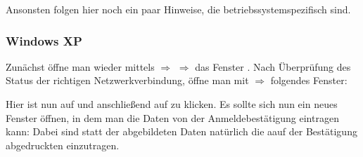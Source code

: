 Ansonsten folgen hier noch ein paar Hinweise, die betriebssystemspezifisch
sind.
\subsubsection{Windows XP}
Zunächst öffne man wieder mittels  $\Rightarrow$
 $\Rightarrow$  das Fenster
. Nach Überprüfung des Status der richtigen
Netzwerkverbindung, öffne man mit  $\Rightarrow$
 folgendes Fenster:

Hier ist nun auf  und anschließend
auf  zu klicken. Es sollte sich nun ein neues
Fenster öffnen, in dem man die Daten von der Anmeldebestätigung
eintragen kann:
Dabei sind statt der abgebildeten Daten natürlich die aauf der
Bestätigung abgedruckten
einzutragen. 






